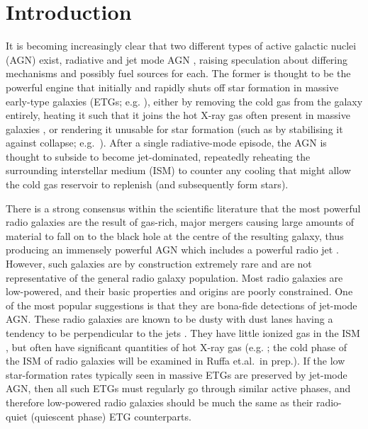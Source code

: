 \documentclass[a4paper,fleqn,usenatbib]{mnras}
\begin{document}



\section{Introduction}
	\label{sec:intro}
	It is becoming increasingly clear that two different types of active galactic nuclei (AGN) exist, radiative and jet mode AGN \citep[e.g.][]{Antonucci2012, Heckman2014}, raising speculation about differing mechanisms and possibly fuel sources for each. The former is thought to be the powerful engine that initially and rapidly shuts off star formation in massive early-type galaxies (ETGs; e.g. \citealt{Thomas2005, Thomas2010}), either by removing the cold gas from the galaxy entirely, heating it such that it joins the hot X-ray gas often present in massive galaxies \citep[e.g.][]{OSullivan2001}, or rendering it unusable for star formation (such as by stabilising it against collapse; e.g.\ \citealt{Martig2009}). After a single radiative-mode episode, the AGN is thought to subside to become jet-dominated, repeatedly reheating the surrounding interstellar medium (ISM) to counter any cooling that might allow the cold gas reservoir to replenish (and subsequently form stars). 

	There is a strong consensus within the scientific literature that the most powerful radio galaxies are the result of gas-rich, major mergers causing large amounts of material to fall on to the black hole at the centre of the resulting galaxy, thus producing an immensely powerful AGN which includes a powerful radio jet \citep[e.g.][]{Malin1983, Quillen1992, Lim2000}. However, such galaxies are by construction extremely rare and are not representative of the general radio galaxy population. Most radio galaxies are low-powered, and their basic properties and origins are poorly constrained. One of the most popular suggestions is that they are bona-fide detections of jet-mode AGN.%
	These radio galaxies are known to be dusty with dust lanes having a tendency to be perpendicular to the jets \citep[e.g.][]{DeRuiter2002, VerdoesKleijn2005}. They have little ionized gas in the ISM \citep[e.g.][]{Sarzi2005}, but often have significant quantities of hot X-ray gas (e.g. \citealt{Canizares1987}; the cold phase of the ISM of radio galaxies will be examined in Ruffa et.al.\ in prep.). If the low star-formation rates typically seen in massive ETGs are preserved by jet-mode AGN, then all such ETGs must regularly go through similar active phases, and therefore low-powered radio galaxies should be much the same as their radio-quiet (quiescent phase) ETG counterparts. 
\end{document}
